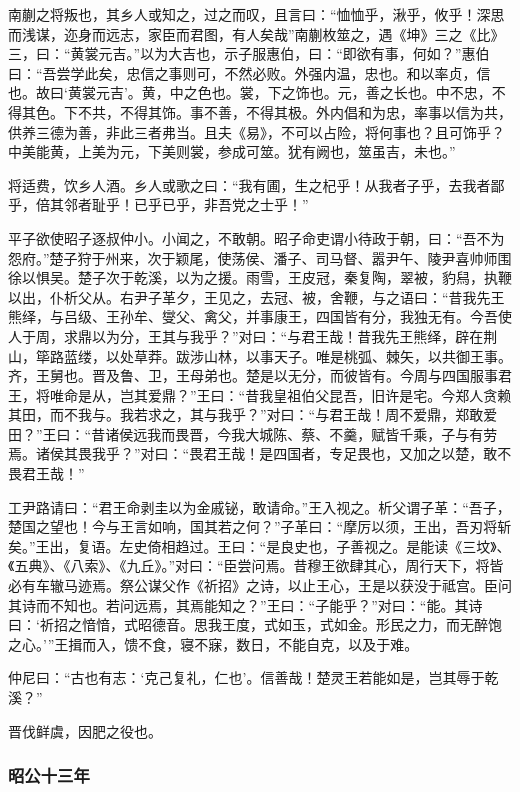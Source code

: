 \documentclass[]{article}
\begin{document}
南蒯之将叛也，其乡人或知之，过之而叹，且言曰：``恤恤乎，湫乎，攸乎！深思而浅谋，迩身而远志，家臣而君图，有人矣哉''南蒯枚筮之，遇《坤》三之《比》三，曰：``黄裳元吉。''以为大吉也，示子服惠伯，曰：``即欲有事，何如？''惠伯曰：``吾尝学此矣，忠信之事则可，不然必败。外强内温，忠也。和以率贞，信也。故曰`黄裳元吉'。黄，中之色也。裳，下之饰也。元，善之长也。中不忠，不得其色。下不共，不得其饰。事不善，不得其极。外内倡和为忠，率事以信为共，供养三德为善，非此三者弗当。且夫《易》，不可以占险，将何事也？且可饰乎？中美能黄，上美为元，下美则裳，参成可筮。犹有阙也，筮虽吉，未也。''

将适费，饮乡人酒。乡人或歌之曰：``我有圃，生之杞乎！从我者子乎，去我者鄙乎，倍其邻者耻乎！已乎已乎，非吾党之士乎！''

平子欲使昭子逐叔仲小。小闻之，不敢朝。昭子命吏谓小待政于朝，曰：``吾不为怨府。''楚子狩于州来，次于颖尾，使荡侯、潘子、司马督、嚣尹午、陵尹喜帅师围徐以惧吴。楚子次于乾溪，以为之援。雨雪，王皮冠，秦复陶，翠被，豹舄，执鞭以出，仆析父从。右尹子革夕，王见之，去冠、被，舍鞭，与之语曰：``昔我先王熊绎，与吕级、王孙牟、燮父、禽父，并事康王，四国皆有分，我独无有。今吾使人于周，求鼎以为分，王其与我乎？''对曰：``与君王哉！昔我先王熊绎，辟在荆山，筚路蓝缕，以处草莽。跋涉山林，以事天子。唯是桃弧、棘矢，以共御王事。齐，王舅也。晋及鲁、卫，王母弟也。楚是以无分，而彼皆有。今周与四国服事君王，将唯命是从，岂其爱鼎？''王曰：``昔我皇祖伯父昆吾，旧许是宅。今郑人贪赖其田，而不我与。我若求之，其与我乎？''对曰：``与君王哉！周不爱鼎，郑敢爱田？''王曰：``昔诸侯远我而畏晋，今我大城陈、蔡、不羹，赋皆千乘，子与有劳焉。诸侯其畏我乎？''对曰：``畏君王哉！是四国者，专足畏也，又加之以楚，敢不畏君王哉！''

工尹路请曰：``君王命剥圭以为金戚铋，敢请命。''王入视之。析父谓子革：``吾子，楚国之望也！今与王言如响，国其若之何？''子革曰：``摩厉以须，王出，吾刃将斩矣。''王出，复语。左史倚相趋过。王曰：``是良史也，子善视之。是能读《三坟》、《五典》、《八索》、《九丘》。''对曰：``臣尝问焉。昔穆王欲肆其心，周行天下，将皆必有车辙马迹焉。祭公谋父作《祈招》之诗，以止王心，王是以获没于祗宫。臣问其诗而不知也。若问远焉，其焉能知之？''王曰：``子能乎？''对曰：``能。其诗曰：`祈招之愔愔，式昭德音。思我王度，式如玉，式如金。形民之力，而无醉饱之心。'''王揖而入，馈不食，寝不寐，数日，不能自克，以及于难。

仲尼曰：``古也有志：`克己复礼，仁也'。信善哉！楚灵王若能如是，岂其辱于乾溪？''

晋伐鲜虞，因肥之役也。

\hypertarget{header-n2579}{%
\subsubsection{昭公十三年}\label{header-n2579}}
\end{document}
